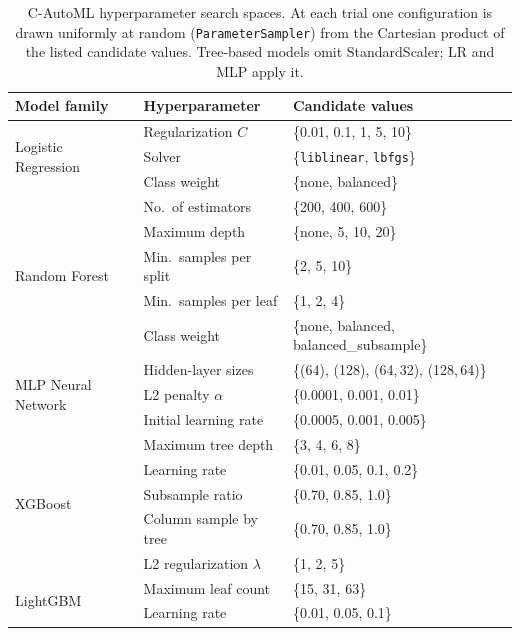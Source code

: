 \documentclass[diagnostics,article,submit,pdftex,moreauthors]{Definitions/mdpi}
\begin{document}
\begin{table}[htbp]
\caption{C-AutoML hyperparameter search spaces.
    At each trial one configuration is drawn uniformly at random
    (\texttt{ParameterSampler}) from the Cartesian product of the listed
    candidate values.  Tree-based models omit StandardScaler;
    \ac{LR} and \ac{MLP} apply it.}
\label{tab:hpo-search-spaces}
\small
\begin{tabularx}{\linewidth}{llX}
\toprule
\textbf{Model family} & \textbf{Hyperparameter} & \textbf{Candidate values} \\
\midrule
\multirow{3}{*}{Logistic Regression}
  & Regularization $C$          & \{0.01, 0.1, 1, 5, 10\} \\
  & Solver                      & \{\texttt{liblinear}, \texttt{lbfgs}\} \\
  & Class weight                & \{none, balanced\} \\
\midrule
\multirow{5}{*}{Random Forest}
  & No.\ of estimators          & \{200, 400, 600\} \\
  & Maximum depth               & \{none, 5, 10, 20\} \\
  & Min.\ samples per split     & \{2, 5, 10\} \\
  & Min.\ samples per leaf      & \{1, 2, 4\} \\
  & Class weight                & \{none, balanced, balanced\_subsample\} \\
\midrule
\multirow{3}{*}{MLP Neural Network}
  & Hidden-layer sizes          & \{(64), (128), (64,\,32), (128,\,64)\} \\
  & L2 penalty $\alpha$         & \{0.0001, 0.001, 0.01\} \\
  & Initial learning rate       & \{0.0005, 0.001, 0.005\} \\
\midrule
\multirow{5}{*}{XGBoost}
  & Maximum tree depth          & \{3, 4, 6, 8\} \\
  & Learning rate               & \{0.01, 0.05, 0.1, 0.2\} \\
  & Subsample ratio             & \{0.70, 0.85, 1.0\} \\
  & Column sample by tree       & \{0.70, 0.85, 1.0\} \\
  & L2 regularization $\lambda$ & \{1, 2, 5\} \\
\midrule
\multirow{5}{*}{LightGBM}
  & Maximum leaf count          & \{15, 31, 63\} \\
  & Learning rate               & \{0.01, 0.05, 0.1\} \\

\end{tabularx}
\end{table}
\end{document}
